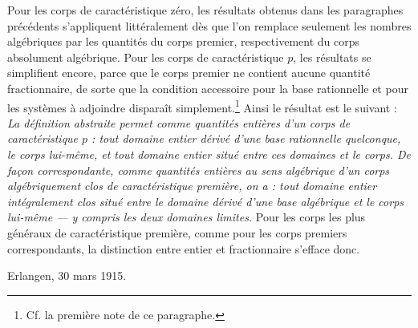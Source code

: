 Pour les corps de caractéristique zéro, les résultats obtenus dans les paragraphes précédents s'appliquent littéralement dès que l'on remplace seulement les \og{} nombres algébriques \fg{} par les quantités du corps premier, respectivement du corps absolument algébrique. Pour les corps de caractéristique $p$, les résultats se simplifient encore, parce que le corps premier ne contient aucune quantité fractionnaire, de sorte que la condition accessoire pour la base rationnelle et pour les systèmes à adjoindre disparaît simplement.\footnote{Cf. la première note de ce paragraphe.} Ainsi le résultat est le suivant : \emph{La définition abstraite permet comme quantités entières d'un corps de caractéristique $p$ : tout domaine entier dérivé d'une base rationnelle quelconque, le corps lui-même, et tout domaine entier situé entre ces domaines et le corps. De façon correspondante, comme quantités entières au sens algébrique d'un corps algébriquement clos de caractéristique première, on a : tout domaine entier intégralement clos situé entre le domaine dérivé d'une base algébrique et le corps lui-même --- y compris les deux domaines limites.} Pour les corps les plus généraux de caractéristique première, comme pour les corps premiers correspondants, la distinction entre entier et fractionnaire s'efface donc.

\medskip
\noindent Erlangen, 30 mars 1915.
